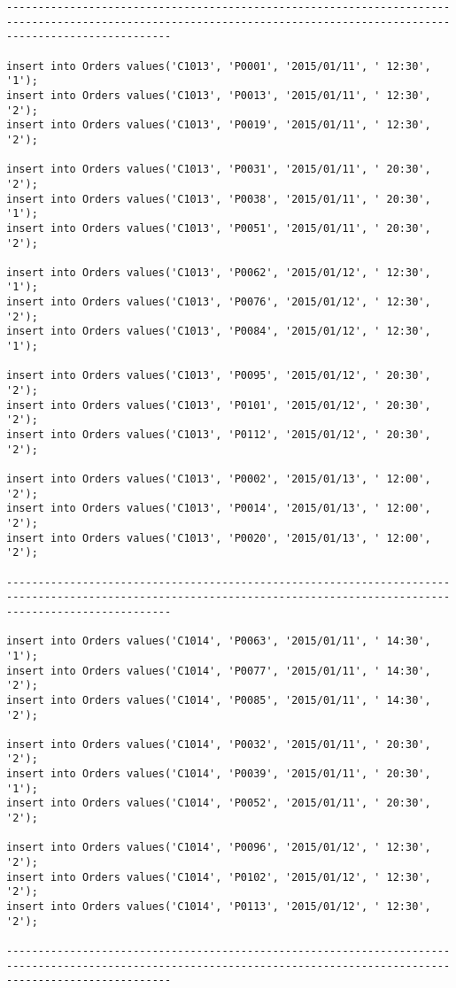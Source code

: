 \documentclass[a4,12pt]{report}
\begin{document}
\begin{lstlisting}
----------------------------------------------------------------------------------------------------------------------------------------------------------------------

insert into Orders values('C1013', 'P0001', '2015/01/11', ' 12:30', '1');
insert into Orders values('C1013', 'P0013', '2015/01/11', ' 12:30', '2');
insert into Orders values('C1013', 'P0019', '2015/01/11', ' 12:30', '2');

insert into Orders values('C1013', 'P0031', '2015/01/11', ' 20:30', '2');
insert into Orders values('C1013', 'P0038', '2015/01/11', ' 20:30', '1');
insert into Orders values('C1013', 'P0051', '2015/01/11', ' 20:30', '2');

insert into Orders values('C1013', 'P0062', '2015/01/12', ' 12:30', '1');
insert into Orders values('C1013', 'P0076', '2015/01/12', ' 12:30', '2');
insert into Orders values('C1013', 'P0084', '2015/01/12', ' 12:30', '1');

insert into Orders values('C1013', 'P0095', '2015/01/12', ' 20:30', '2');
insert into Orders values('C1013', 'P0101', '2015/01/12', ' 20:30', '2');
insert into Orders values('C1013', 'P0112', '2015/01/12', ' 20:30', '2');

insert into Orders values('C1013', 'P0002', '2015/01/13', ' 12:00', '2');
insert into Orders values('C1013', 'P0014', '2015/01/13', ' 12:00', '2');
insert into Orders values('C1013', 'P0020', '2015/01/13', ' 12:00', '2');

----------------------------------------------------------------------------------------------------------------------------------------------------------------------

insert into Orders values('C1014', 'P0063', '2015/01/11', ' 14:30', '1');
insert into Orders values('C1014', 'P0077', '2015/01/11', ' 14:30', '2');
insert into Orders values('C1014', 'P0085', '2015/01/11', ' 14:30', '2');

insert into Orders values('C1014', 'P0032', '2015/01/11', ' 20:30', '2');
insert into Orders values('C1014', 'P0039', '2015/01/11', ' 20:30', '1');
insert into Orders values('C1014', 'P0052', '2015/01/11', ' 20:30', '2');

insert into Orders values('C1014', 'P0096', '2015/01/12', ' 12:30', '2');
insert into Orders values('C1014', 'P0102', '2015/01/12', ' 12:30', '2');
insert into Orders values('C1014', 'P0113', '2015/01/12', ' 12:30', '2');

----------------------------------------------------------------------------------------------------------------------------------------------------------------------


\end{lstlisting}
\end{document}
